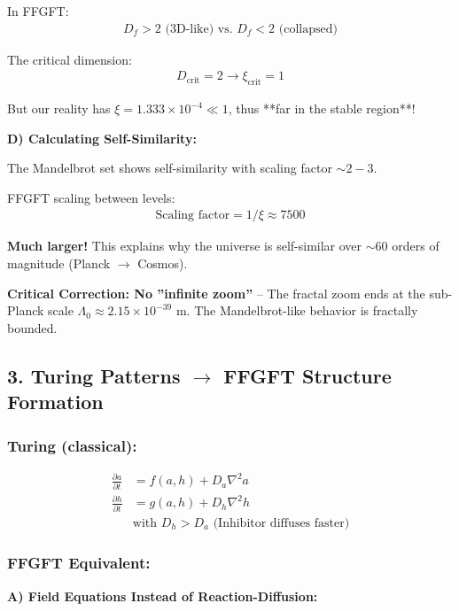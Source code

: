 \documentclass[12pt,a4paper]{article}
\begin{document}
	In FFGFT:
	\begin{align*}
		D_f > 2 \text{ (3D-like) vs. } D_f < 2 \text{ (collapsed)}
	\end{align*}
	
	The critical dimension:
	\begin{align*}
		D_{\text{crit}} = 2 \rightarrow \xi_{\text{crit}} = 1
	\end{align*}
	
	But our reality has $\xi = 1.333 \times 10^{-4} \ll 1$, thus **far in the stable region**!
	
	\textbf{D) Calculating Self-Similarity:}
	
	The Mandelbrot set shows self-similarity with scaling factor $\sim 2-3$.
	
	FFGFT scaling between levels:
	\begin{align*}
		\text{Scaling factor} = 1/\xi \approx 7500
	\end{align*}
	
	\textbf{Much larger!} This explains why the universe is self-similar over $\sim 60$ orders of magnitude (Planck $\to$ Cosmos).
	
	\textbf{Critical Correction: No ''infinite zoom''} – The fractal zoom ends at the sub-Planck scale $\Lambda_0 \approx 2.15 \times 10^{-39}$ m. The Mandelbrot-like behavior is fractally bounded.
	
	\subsection*{3. Turing Patterns $\rightarrow$ FFGFT Structure Formation}
	
	\subsubsection*{Turing (classical):}
	\begin{align*}
		\frac{\partial a}{\partial t} &= f(a,h) + D_a \nabla^2 a \\
		\frac{\partial h}{\partial t} &= g(a,h) + D_h \nabla^2 h \\
		&\text{with } D_h > D_a \text{ (Inhibitor diffuses faster)}
	\end{align*}
	
	\subsubsection*{FFGFT Equivalent:}
	
	\textbf{A) Field Equations Instead of Reaction-Diffusion:}
	
\end{document}
